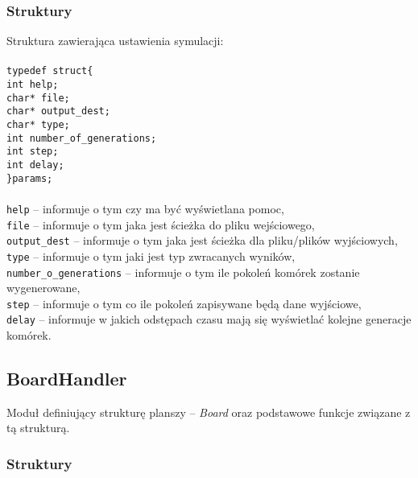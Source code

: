 \documentclass{article}
\begin{document}
\subsubsection{Struktury}
Struktura zawierająca ustawienia symulacji: \\\\
\texttt{typedef struct\{\\
	 \hspace*{10mm}int help;\\
	 \hspace*{10mm}char* file;\\
	 \hspace*{10mm}char* output\_dest;\\
	 \hspace*{10mm}char* type;\\
	 \hspace*{10mm}int number\_of\_generations;\\
	 \hspace*{10mm}int step;\\
	 \hspace*{10mm}int delay;\\
\}params;\\}
\\
\texttt{help} -- informuje o tym czy ma być wyświetlana pomoc,\\
\texttt{file} -- informuje o tym jaka jest ścieżka do pliku wejściowego,\\
\texttt{output\_dest} --  informuje o tym jaka jest ścieżka dla pliku/plików wyjściowych,\\
\texttt{type} -- informuje o tym jaki jest typ zwracanych wyników,\\
\texttt{number\_o\_generations} -- informuje o tym ile pokoleń komórek zostanie wygenerowane,\\
\texttt{step} -- informuje o tym co ile pokoleń zapisywane będą dane wyjściowe,\\
\texttt{delay} -- informuje w jakich odstępach czasu mają się wyświetlać kolejne generacje komórek.\\

\subsection{BoardHandler}
Moduł definiujący strukturę planszy -- \textit{Board} oraz podstawowe funkcje związane z tą strukturą.

\subsubsection{Struktury}
\end{document}
